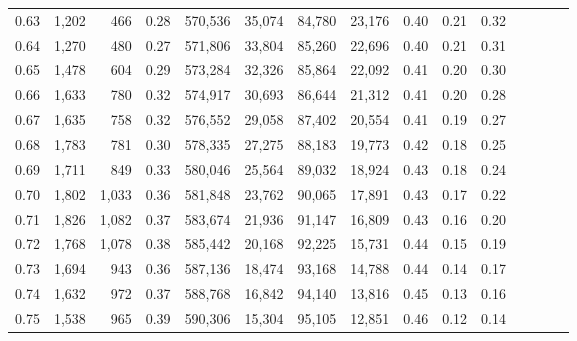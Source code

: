 \begin{tabular}{rrrcrrrrrrrrrrr}
0.63 &   1,202 &    466 &                                       0.28 &  570,536 &   35,074 &   84,780 &   23,176 &  0.40 &  0.21 &                         0.32 \\
0.64 &   1,270 &    480 &                                       0.27 &  571,806 &   33,804 &   85,260 &   22,696 &  0.40 &  0.21 &                         0.31 \\
0.65 &   1,478 &    604 &                                       0.29 &  573,284 &   32,326 &   85,864 &   22,092 &  0.41 &  0.20 &                         0.30 \\
0.66 &   1,633 &    780 &                                       0.32 &  574,917 &   30,693 &   86,644 &   21,312 &  0.41 &  0.20 &                         0.28 \\
0.67 &   1,635 &    758 &                                       0.32 &  576,552 &   29,058 &   87,402 &   20,554 &  0.41 &  0.19 &                         0.27 \\
0.68 &   1,783 &    781 &                                       0.30 &  578,335 &   27,275 &   88,183 &   19,773 &  0.42 &  0.18 &                         0.25 \\
0.69 &   1,711 &    849 &                                       0.33 &  580,046 &   25,564 &   89,032 &   18,924 &  0.43 &  0.18 &                         0.24 \\
0.70 &   1,802 &  1,033 &                                       0.36 &  581,848 &   23,762 &   90,065 &   17,891 &  0.43 &  0.17 &                         0.22 \\
0.71 &   1,826 &  1,082 &                                       0.37 &  583,674 &   21,936 &   91,147 &   16,809 &  0.43 &  0.16 &                         0.20 \\
0.72 &   1,768 &  1,078 &                                       0.38 &  585,442 &   20,168 &   92,225 &   15,731 &  0.44 &  0.15 &                         0.19 \\
0.73 &   1,694 &    943 &                                       0.36 &  587,136 &   18,474 &   93,168 &   14,788 &  0.44 &  0.14 &                         0.17 \\
0.74 &   1,632 &    972 &                                       0.37 &  588,768 &   16,842 &   94,140 &   13,816 &  0.45 &  0.13 &                         0.16 \\
0.75 &   1,538 &    965 &                                       0.39 &  590,306 &   15,304 &   95,105 &   12,851 &  0.46 &  0.12 &                         0.14 \\

\end{tabular}
